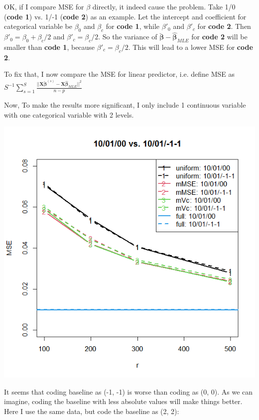 \documentclass[]{article}
\begin{document}
OK, if I compare MSE for $\beta$ directly, it indeed cause the problem. Take 1/0 (\textbf{code 1}) vs. 1/-1 (\textbf{code 2}) as an example. Let the intercept and coefficient for categorical variable be $\beta_0$ and $\beta_c$ for \textbf{code 1}, while  $\beta'_0$ and $\beta'_c$ for \textbf{code 2}. Then $\beta'_0 = \beta_0 + \beta_c/2$ and $\beta'_c = \beta_c/2$. So the variance of $\boldsymbol{\breve{\beta}} - \hat{\boldsymbol{\beta}}_{MLE}$ for \textbf{code 2} will be smaller than \textbf{code 1}, because $\beta'_c = \beta_c/2$. This will lead to a lower MSE for \textbf{code 2}.

To fix that, I now compare the MSE for linear predictor, i.e. define MSE as $S^{-1}\sum_{s=1}^{S}\frac{||\boldsymbol{X}\breve{\boldsymbol{\beta}}^{(s)} - \boldsymbol{X}\hat{\boldsymbol{\beta}}_{MLE}||^2}{n - p}$

Now, To make the results more significant, I only include 1 continuous variable with one categorical variable with 2 levels. 

\includegraphics[width = .8\textwidth]{plot_2levels.png}

It seems that coding baseline as (-1, -1) is worse than coding as (0, 0). As we can imagine, coding the baseline with less absolute values will make things better. Here I use the same data, but code the baseline as (2, 2):
\end{document}
